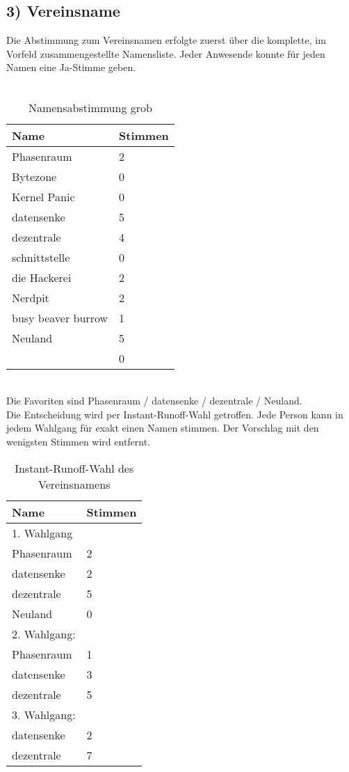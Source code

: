\documentclass[10pt,a4paper]{scrartcl}
\newcommand{\qs}[1]{\glqq#1\grqq}
\begin{document}
\subsection*{3) Vereinsname}
    Die Abstimmung zum Vereinsnamen erfolgte zuerst {\"u}ber die komplette, im Vorfeld zusammengestellte Namensliste.
	Jeder Anwesende konnte f{\"u}r jeden Namen eine Ja-Stimme geben.\\\\
\begin{table}[h!]
  \centering
  \caption{Namensabstimmung grob}
  \label{tab:table1}
  \begin{tabular}{p{6cm}||p{3cm}}
  \textbf{Name} & \textbf{Stimmen}\\
    \hline
    \hline
    Phasenraum & 2\\
    Bytezone & 0\\
    Kernel Panic & 0\\
    datensenke & 5\\
    dezentrale & 4\\
    schnittstelle & 0\\
    die Hackerei & 2\\
    Nerdpit & 2\\
    busy beaver burrow & 1\\
    Neuland & 5\\
    \qs{\ \ } & 0\\
    \hline
    \hline
  \end{tabular}
\end{table}
\\
Die Favoriten sind \qs{Phasenraum} / \qs{datensenke} / \qs{dezentrale} / \qs{Neuland}.\\
Die Entscheidung wird per Instant-Runoff-Wahl getroffen. Jede Person kann in jedem Wahlgang f{\"u}r exakt einen Namen stimmen. Der Vorschlag mit den wenigsten Stimmen wird entfernt.\\
\begin{table}[h!]
  \centering
  \caption{Instant-Runoff-Wahl des Vereinsnamens}
  \label{tab:table2}
  \begin{tabular}{p{6cm}||p{3cm}}
  \textbf{Name} & \textbf{Stimmen}\\
    \hline
    \hline
    1. Wahlgang\\
    Phasenraum & 2\\
    datensenke & 2\\
    dezentrale & 5\\
    Neuland & 0\\
    \hline
    2. Wahlgang:\\
    Phasenraum & 1\\
    datensenke & 3\\
    dezentrale & 5\\
    \hline
    3. Wahlgang:\\
    datensenke & 2\\
    dezentrale & 7\\
    \hline
    \hline
  \end{tabular}
\end{table}
\end{document}

